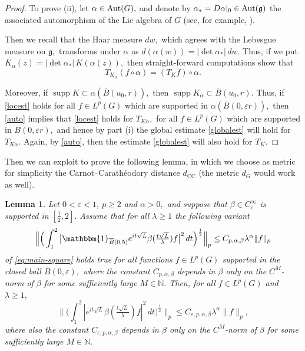 \documentclass[leqno]{amsart}
\newtheorem{lemma}[theorem]{Lemma}
\theoremstyle{definition}
\theoremstyle{remark}
\numberwithin{equation}{section}
\newcommand{\bbone}{{\mathbbm{1}}}
\newcommand{\eps}{\varepsilon}
\DeclareMathOperator*{\supp}{supp}
\newcommand\la{{\lambda}}
\newcommand\Coi{{C^\infty_{\mathrm c}}}
\newcommand\bbN{{\mathbb {N}}}
\newcommand\ve{{\varepsilon}}
\newcommand{\chr}{\bbone}
\begin{document}
\begin{proof}
\medskip

To prove (ii), let $\alpha\in {\rm Aut}(G),$ and denote by $\alpha_*=D\alpha|_0\in {\rm Aut}(\mathfrak g)$ the associated automorphism of the Lie algebra of $G$ (see, for example, \cite{HiNe12}).

Then we recall that the  Haar measure $dw,$ which agrees with the Lebesgue measure on $\mathfrak g,$ transforms under $\alpha$ as 
$d(\alpha(w))=|\det \alpha_*| \,dw.$ Thus, if we put $K_\alpha(z)=|\det \alpha_*| \, K(\alpha(z)),$
then straight-forward computations show that 
\begin{equation}\label{auto}
T_{K_\alpha} (f\circ \alpha)=(T_K f)\circ \alpha.
\end{equation}

Moreover, if $\supp K\subset \alpha(\overline B(u_0,r)),$ then $\supp K_\alpha \subset \overline B(u_0,r).$ Thus, if 
 \eqref{locest} holds for all $f\in L^p(G)$ which are supported in $\alpha(\overline B(0,\ve r)), $  then \eqref{auto} implies that 
\eqref{locest} holds for $T_{K\alpha},$  for all $f\in L^p(G)$ which are supported in $\overline B(0,\ve r), $ and hence by part (i) 
the global estimate \eqref{globalest} will hold for $T_{K\alpha}.$  Again, by \eqref{auto}, then the estimate \eqref{globalest} will also hold for $T_{K}.$
\end{proof} 

Then we can exploit \cite[Proposition~3.1]{MartiniMueller-Metivier} to prove the following lemma, in which we choose as metric for simplicity the  Carnot--Carathéodory distance  $d_{\mathrm{CC}}$ (the metric $d_G$ would work as well).

\begin{lemma} \label{localize1}
Let $0<\eps<1$, $p\ge 2$  and $\alpha> 0,$ and suppose that   $\beta\in \Coi $ is supported in $[\frac{1}{2},2].$  Assume   that  for all $\la\ge 1$ the following variant 
\begin{equation}\label{eq:main-squareloc}
\Big\| \Big( \int_1 ^2 \big|  \chr_{\overline{B}(0,5)} e^{it \sqrt{L}} \beta(\tfrac{t\sqrt{L}}{\la}) f \big|^2 \, dt \Big)^{\frac 12} \Big\|_p \le C_{p,\alpha,\beta}  \la^\alpha \|f\|_p
\end{equation}
of  \eqref{eq:main-square}  holds true  for all  functions $f\in L^p(G)$ supported in the closed  ball $\overline B(0,\eps),$  where the constant $C_{p,\alpha,\beta}$ depends in $\beta$ only on the $C^M$-norm of $\beta$ for some sufficiently large $M\in\bbN.$
Then, for all $f\in L^p(G)$ and $\la\ge 1,$ 
\begin{equation}\label{eq:dualsqeps}
\Big\| \Big(\int_1^2 | e^{it\sqrt L} \beta (\tfrac{t\sqrt L} \la)f|^2   \,dt \Big)^{\frac{1}{2}} \Big\|_p \le C_{\eps, p,\alpha,\beta} \la^\alpha \|f\|_p,
\end{equation}
 where also the  constant $C_{\eps, p,\alpha,\beta}$ depends in $\beta$ only on the $C^M$-norm of $\beta$ for some sufficiently large $M\in\bbN.$
\end{lemma}
\end{document}
